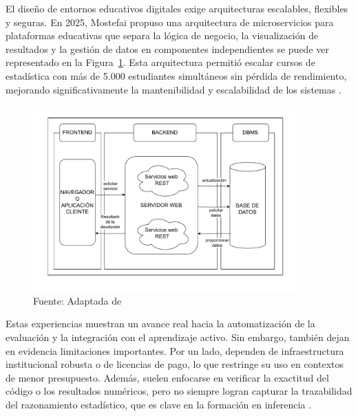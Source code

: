 \documentclass[letter,oneside,12pt,spanish]{report}
\begin{document}
El diseño de entornos educativos digitales exige arquitecturas escalables, flexibles y seguras. En 2025, Mostefai propuso una arquitectura de microservicios para plataformas educativas que separa la lógica de negocio, la visualización de resultados y la gestión de datos en componentes independientes se puede ver representado en la Figura~\ref{fig:Microservicios}. Esta arquitectura permitió escalar cursos de estadística con más de 5.000 estudiantes simultáneos sin pérdida de rendimiento, mejorando significativamente la mantenibilidad y escalabilidad de los sistemas \parencite{Mostefai2025}.

\begin{figure}[ht]
    \centering
    \includegraphics[width=0.9\textwidth]{Figs/Microservicios.pdf}
    \label{fig:Microservicios}
    \\Fuente: Adaptada de \textcite{Mostefai2025}
\end{figure}



Estas experiencias muestran un avance real hacia la automatización de la evaluación y la integración con el aprendizaje activo. Sin embargo, también dejan en evidencia limitaciones importantes. Por un lado, dependen de infraestructura institucional robusta o de licencias de pago, lo que restringe su uso en contextos de menor presupuesto. Además, suelen enfocarse en verificar la exactitud del código o los resultados numéricos, pero no siempre logran capturar la trazabilidad del razonamiento estadístico, que es clave en la formación en inferencia \parencite{alhaddad2024}.
\end{document}
